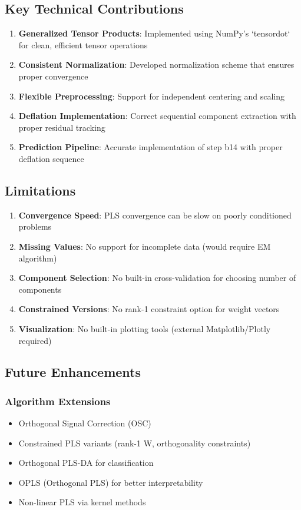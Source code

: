 \documentclass[12pt,a4paper]{article}
\begin{document}
\subsection{Key Technical Contributions}

\begin{enumerate}
    \item \textbf{Generalized Tensor Products}: Implemented using NumPy's `tensordot` for clean, efficient tensor operations
    \item \textbf{Consistent Normalization}: Developed normalization scheme that ensures proper convergence
    \item \textbf{Flexible Preprocessing}: Support for independent centering and scaling
    \item \textbf{Deflation Implementation}: Correct sequential component extraction with proper residual tracking
    \item \textbf{Prediction Pipeline}: Accurate implementation of step b14 with proper deflation sequence
\end{enumerate}

\subsection{Limitations}

\begin{enumerate}
    \item \textbf{Convergence Speed}: PLS convergence can be slow on poorly conditioned problems
    \item \textbf{Missing Values}: No support for incomplete data (would require EM algorithm)
    \item \textbf{Component Selection}: No built-in cross-validation for choosing number of components
    \item \textbf{Constrained Versions}: No rank-1 constraint option for weight vectors
    \item \textbf{Visualization}: No built-in plotting tools (external Matplotlib/Plotly required)
\end{enumerate}

\subsection{Future Enhancements}

\subsubsection{Algorithm Extensions}
\begin{itemize}
    \item Orthogonal Signal Correction (OSC) \citep{wold1998orthogonal}
    \item Constrained PLS variants (rank-1 W, orthogonality constraints)
    \item Orthogonal PLS-DA for classification
    \item OPLS (Orthogonal PLS) for better interpretability
    \item Non-linear PLS via kernel methods
\end{itemize}
\end{document}
